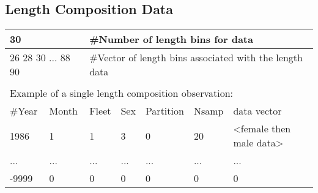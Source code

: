 \subsection{Length Composition Data}
\begin{center}
	\begin{tabular}{p{1.5cm} p{1.5cm} p{1.5cm} p{1.5cm} p{1.5cm} p{1.5cm} p{5cm}}
		\hline
		\multicolumn{2}{l}{30} & \multicolumn{5}{l}{\#Number of length bins for data}\\
		\hline
		\multicolumn{2}{l}{26 28 30 ... 88 90} &  \multicolumn{5}{l}{\#Vector of length bins associated with the length data}\\
		\hline
		\\
		\multicolumn{7}{l}{Example of a single length composition observation:} \\
		\hline
		\#Year & Month & Fleet & Sex & Partition & Nsamp & data vector\\
		\hline
		1986 & 1 & 1 & 3 & 0 & 20 & <female then male data> \\
		... & ...& ... & ... & ...& ... & ... \\
		-9999 & 0 & 0 & 0 & 0 & 0 & 0 \\
		\hline	
	\end{tabular}
\end{center}

